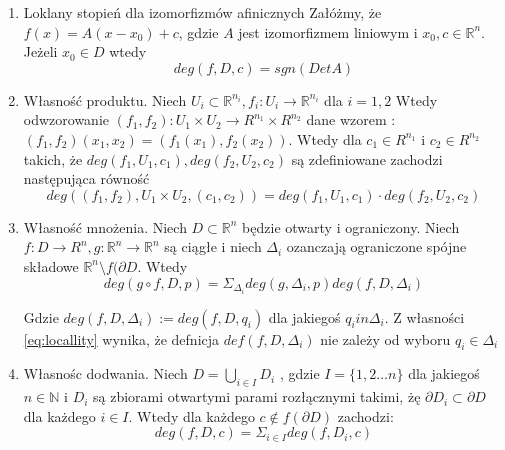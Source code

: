 \begin{enumerate}
    \item Loklany stopień dla izomorfizmów afinicznych \newline
    Załóżmy, że $ f(x) = A(x-x_0) + c $, gdzie $ A $ jest izomorfizmem liniowym i $ x_0,c \in \mathbb R^n $. 
    Jeżeli $ x_0 \in D$ wtedy
    \begin{equation}
        deg(f,D,c) = sgn(Det A)
    \end{equation}
    
    \item Własność produktu. \newline
     Niech $ U_i \subset \mathbb R^{n_i}, f_i : U_i  \to \mathbb R^{n_i} $ dla $ i =1,2 $
     Wtedy odwzorowanie $ (f_1,f_2) : U_1 \times U_2 \to R^{n_1} \times R^{n_2} $ dane wzorem :
     $ (f_1,f_2)(x_1,x_2) = (f_1(x_1),f_2(x_2)) $. Wtedy dla $c_1 \in R^{n_1}  $ i $ c_2 \in R^{n_2} $ takich, że $ deg(f_1,U_1,c_1),deg(f_2,U_2,c_2) $ są zdefiniowane 
     zachodzi następująca równość 
     \begin{equation}
	deg((f_1,f_2), U_1 \times U_2 , (c_1,c_2)) = deg(f_1,U_1,c_1) \cdot deg(f_2,U_2,c_2)
     \end{equation}
     
     \item Własność mnożenia. \newline
     Niech $ D \subset \mathbb R^n $ będzie otwarty i ograniczony. Niech $ f : D \to R^n , g : \mathbb R^n \to \mathbb R^n $ są ciągłe i niech $ \Delta_i $ ozanczają 
     ograniczone spójne składowe $ \mathbb R^n \setminus f(\partial{D}$. Wtedy 
     \begin{equation}
	  deg (g \circ f ,D,p) = \Sigma_{\Delta_i} deg(g,\Delta_i,p)deg(f,D,\Delta_i) 
     \end{equation}
     
     Gdzie $ deg(f,D,\Delta_i) := deg(f,D,q_i)$ dla jakiegoś $ q_i in \Delta_i $. Z własności \ref{eq:locallity} wynika, że defnicja $ def(f,D,\Delta_i ) $ nie zależy od wyboru
     $ q_i \in \Delta_i $
     
     \item Własnośc dodwania. \newline
     Niech $ D = \bigcup_{i \in I} D_i $ , gdzie $ I = \{1,2 \dots n \} $ dla jakiegoś $ n \in \mathbb N $ i $ D_i $ są zbiorami otwartymi parami rozłącznymi takimi, żę 
     $ \partial{D_i} \subset \partial{D} $ dla każdego $ i \in I $. Wtedy dla każdego $ c \notin f(\partial{D})  $ zachodzi:
     \begin{equation}
	deg(f,D,c) = \Sigma_{i \in I} deg(f,D_i,c)
     \end{equation}
     








\end{enumerate}

